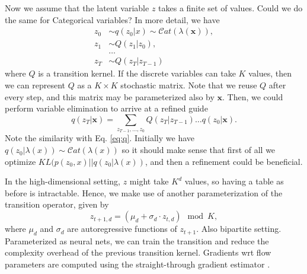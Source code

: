 
\iffalse
Now we assume that the latent variable $z$ takes a finite set of values.
Could we do the same for Categorical variables?  In more detail, we have
\begin{align*}
z_0 &\sim q(z_0 | x) \sim \mathcal{C}at(\lambda(\bm{x})), \\
z_1 &\sim Q(z_1 | z_0), \\
&\ldots \\
z_{T} &\sim Q(z_T | z_{T-1})
\end{align*}
where $Q$ is a transition kernel. If the discrete variables can
take $K$ values, then we can represent $Q$ as a $K\times K$ stochastic
matrix. Note that we reuse $Q$ after every step, and this matrix 
may be parameterized also by $\bm{x}$. Then, we could perform variable elimination to arrive at a refined guide 
$$
q(z_T | \bm{x}) = \sum_{z_{T-1}, \ldots, z_0 } Q(z_T| z_{T-1}) \ldots q(z_0 | \bm{x}).
$$
Note the similarity with Eq. \ref{eq:q}. Initially we have $q(z_0| \lambda(x)) \sim \mathcal{C}at(\lambda(x))$ so it should make sense that first of all we optimize $KL(p(z_0, x) || q(z_0 | \lambda(x))$, and then a refinement could be beneficial.

In the high-dimensional setting, $z$ might take $K^d$ values, so having a table as before is intractable. Hence, we make use of another parameterization of the transition operator, given by
$$
z_{t+1,d} = (\mu_d + \sigma_d \cdot z_{t,d}) \mod K,
$$
where $\mu_d$ and $\sigma_d$ are autoregressive functions of $z_{t+1}$. Also bipartite setting. Parameterized as neural nets, we can train the transition and reduce the complexity overhead of the previous transition kernel. Gradients wrt flow parameters are computed using the straight-through gradient estimator \cite{bengio2013estimating}.

